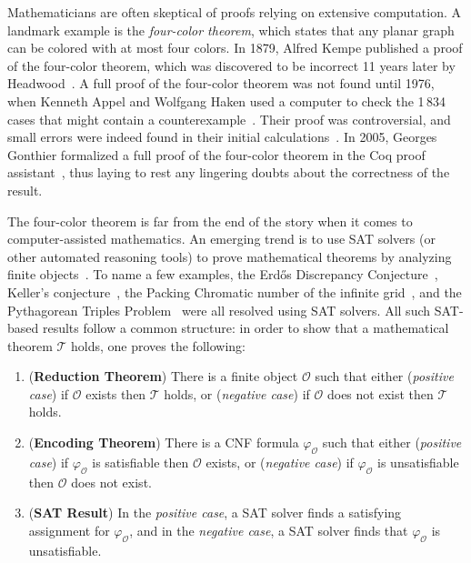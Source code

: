 Mathematicians are often skeptical of proofs relying on extensive computation.
A landmark example is the \emph{four-color theorem}, which states that any planar graph can be colored with at most four colors. 
In 1879, Alfred Kempe published a proof of the four-color theorem, which was discovered to be incorrect 11 years later by Headwood~\cite{Walters2004ItAT,Wilson2002GraphsCA}.
A full proof of the four-color theorem was not found until 1976, when Kenneth Appel and Wolfgang Haken used a computer to check the 1\,834 cases that might contain a counterexample~\cite{appelFourColorProblem1978}.
Their proof was controversial, and small errors were indeed found in their initial calculations~\cite{Walters2004ItAT,Wilson2002GraphsCA}.
In 2005, Georges Gonthier formalized a full proof of the four-color theorem in the \textsf{Coq} proof assistant~\cite{gonthierFourColourTheorem2008a}, thus laying to rest any lingering doubts about the correctness of the result.

The four-color theorem is far from the end of the story when it comes to computer-assisted mathematics.
An emerging trend is to use SAT solvers (or other automated reasoning tools) to prove mathematical theorems by analyzing finite objects~\cite{avigad2023mathematics}. 
To name a few examples, the Erd\H{o}s Discrepancy Conjecture~\cite{konev2014sat}, Keller's conjecture~\cite{brakensiek2023resolution}, the Packing Chromatic number of the infinite grid~\cite{Subercaseaux_Heule_2023}, and the Pythagorean Triples Problem~\cite{Heule_2016} were all resolved using SAT solvers.
All such SAT-based results follow a common structure: in order to show that a mathematical theorem $\mathcal{T}$ holds, one proves the following:

\begin{enumerate}
  \item (\textbf{Reduction Theorem}) There is a finite object $\mathcal{O}$ such that either (\emph{positive case}) if $\mathcal{O}$ exists then $\mathcal{T}$ holds, or (\emph{negative case}) if $\mathcal{O}$ does not exist then $\mathcal{T}$ holds. %
  \item (\textbf{Encoding Theorem}) There is a CNF formula $\varphi_{\mathcal{O}}$ such that either (\emph{positive case}) if $\varphi_{\mathcal{O}}$ is satisfiable then $\mathcal{O}$ exists, or (\emph{negative case}) if $\varphi_{\mathcal{O}}$ is unsatisfiable then $\mathcal{O}$ does not exist.
  \item (\textbf{SAT Result}) In the \emph{positive case}, a SAT solver finds a satisfying assignment for $\varphi_{\mathcal{O}}$, and in the \emph{negative case}, a SAT solver finds that $\varphi_{\mathcal{O}}$ is unsatisfiable.
\end{enumerate}

